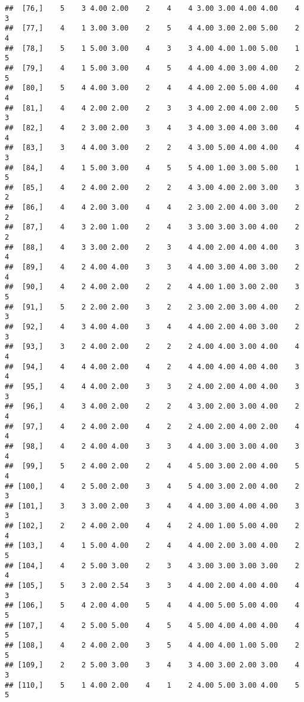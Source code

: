 \documentclass[]{article}
\begin{document}
\begin{verbatim}
##  [76,]    5    3 4.00 2.00    2    4    4 3.00 3.00 4.00 4.00    4    3
##  [77,]    4    1 3.00 3.00    2    5    4 4.00 3.00 2.00 5.00    2    4
##  [78,]    5    1 5.00 3.00    4    3    3 4.00 4.00 1.00 5.00    1    5
##  [79,]    4    1 5.00 3.00    4    5    4 4.00 4.00 3.00 4.00    2    5
##  [80,]    5    4 4.00 3.00    2    4    4 4.00 2.00 5.00 4.00    4    4
##  [81,]    4    4 2.00 2.00    2    3    3 4.00 2.00 4.00 2.00    5    3
##  [82,]    4    2 3.00 2.00    3    4    3 4.00 3.00 4.00 3.00    4    4
##  [83,]    3    4 4.00 3.00    2    2    4 3.00 5.00 4.00 4.00    4    3
##  [84,]    4    1 5.00 3.00    4    5    5 4.00 1.00 3.00 5.00    1    5
##  [85,]    4    2 4.00 2.00    2    2    4 3.00 4.00 2.00 3.00    3    2
##  [86,]    4    4 2.00 3.00    4    4    2 3.00 2.00 4.00 3.00    2    2
##  [87,]    4    3 2.00 1.00    2    4    3 3.00 3.00 3.00 4.00    2    2
##  [88,]    4    3 3.00 2.00    2    3    4 4.00 2.00 4.00 4.00    3    4
##  [89,]    4    2 4.00 4.00    3    3    4 4.00 3.00 4.00 3.00    2    4
##  [90,]    4    2 4.00 2.00    2    2    4 4.00 1.00 3.00 2.00    3    5
##  [91,]    5    2 2.00 2.00    3    2    2 3.00 2.00 3.00 4.00    2    3
##  [92,]    4    3 4.00 4.00    3    4    4 4.00 2.00 4.00 3.00    2    3
##  [93,]    3    2 4.00 2.00    2    2    2 4.00 4.00 3.00 4.00    4    4
##  [94,]    4    4 4.00 2.00    4    2    4 4.00 4.00 4.00 4.00    3    4
##  [95,]    4    4 4.00 2.00    3    3    2 4.00 2.00 4.00 4.00    3    3
##  [96,]    4    3 4.00 2.00    2    2    4 3.00 2.00 3.00 4.00    2    4
##  [97,]    4    2 4.00 2.00    4    2    2 4.00 2.00 4.00 2.00    4    4
##  [98,]    4    2 4.00 4.00    3    3    4 4.00 3.00 3.00 4.00    3    4
##  [99,]    5    2 4.00 2.00    2    4    4 5.00 3.00 2.00 4.00    5    4
## [100,]    4    2 5.00 2.00    3    4    5 4.00 3.00 2.00 4.00    2    3
## [101,]    3    3 3.00 2.00    3    4    4 4.00 3.00 4.00 4.00    3    3
## [102,]    2    2 4.00 2.00    4    4    2 4.00 1.00 5.00 4.00    2    4
## [103,]    4    1 5.00 4.00    2    4    4 4.00 2.00 3.00 4.00    2    5
## [104,]    4    2 5.00 3.00    2    3    4 3.00 3.00 3.00 3.00    2    4
## [105,]    5    3 2.00 2.54    3    3    4 4.00 2.00 4.00 4.00    4    3
## [106,]    5    4 2.00 4.00    5    4    4 4.00 5.00 5.00 4.00    4    5
## [107,]    4    2 5.00 5.00    4    5    4 5.00 4.00 4.00 4.00    4    5
## [108,]    4    2 4.00 2.00    3    5    4 4.00 4.00 1.00 5.00    2    5
## [109,]    2    2 5.00 3.00    3    4    3 4.00 3.00 2.00 3.00    4    3
## [110,]    5    1 4.00 2.00    4    1    2 4.00 5.00 3.00 4.00    5    5

\end{verbatim}
\end{document}
